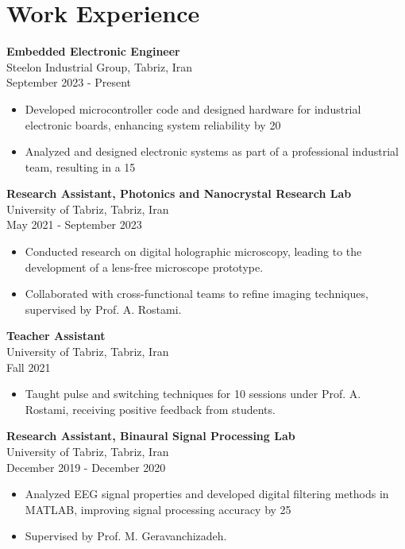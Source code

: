 \documentclass[a4paper,10pt]{article}
\begin{document}
\section{Work Experience}
\textbf{Embedded Electronic Engineer} \\
Steelon Industrial Group, Tabriz, Iran \\
September 2023 - Present \\
\begin{itemize}[noitemsep,topsep=0pt,parsep=0pt,partopsep=0pt]
    \item Developed microcontroller code and designed hardware for industrial electronic boards, enhancing system reliability by 20%
    \item Analyzed and designed electronic systems as part of a professional industrial team, resulting in a 15%
\end{itemize}

\textbf{Research Assistant, Photonics and Nanocrystal Research Lab} \\
University of Tabriz, Tabriz, Iran \\
May 2021 - September 2023 \\
\begin{itemize}[noitemsep,topsep=0pt,parsep=0pt,partopsep=0pt]
    \item Conducted research on digital holographic microscopy, leading to the development of a lens-free microscope prototype.
    \item Collaborated with cross-functional teams to refine imaging techniques, supervised by Prof. A. Rostami.
\end{itemize}

\textbf{Teacher Assistant} \\
University of Tabriz, Tabriz, Iran \\
Fall 2021 \\
\begin{itemize}[noitemsep,topsep=0pt,parsep=0pt,partopsep=0pt]
    \item Taught pulse and switching techniques for 10 sessions under Prof. A. Rostami, receiving positive feedback from students.
\end{itemize}

\textbf{Research Assistant, Binaural Signal Processing Lab} \\
University of Tabriz, Tabriz, Iran \\
December 2019 - December 2020 \\
\begin{itemize}[noitemsep,topsep=0pt,parsep=0pt,partopsep=0pt]
    \item Analyzed EEG signal properties and developed digital filtering methods in MATLAB, improving signal processing accuracy by 25%
    \item Supervised by Prof. M. Geravanchizadeh.
\end{itemize}
\end{document}
